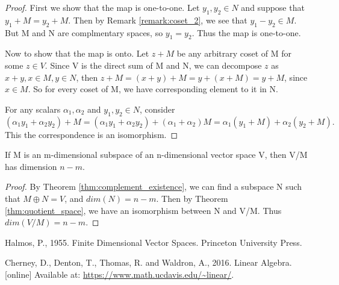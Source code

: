 \documentclass[10pt,a4paper]{article}
\begin{document}
\begin{proof}
    First we show that the map is one-to-one. Let $y_1,y_2\in N$ and suppose that $y_1+M=y_2+M$. Then by Remark \ref{remark:coset_2}, we see that $y_1-y_2\in M$. But M and N are complmentary spaces, so $y_1=y_2$. Thus the map is one-to-one.

    Now to show that the map is onto. Let $z+M$ be any arbitrary coset of M for some $z\in V$. Since V is the direct sum of M and N, we can decompose $z$ as $x+y,x\in M, y\in N$, then $z+M=(x+y)+M=y+(x+M)=y+M$, since $x\in M$. So for every coset of M, we have corresponding element to it in N. 

    For any scalars $\alpha_1,\alpha_2$ and $y_1,y_2\in N$, consider
    $$
        (\alpha_1y_1+\alpha_2y_2)+M=(\alpha_1y_1+\alpha_2y_2)+(\alpha_1+\alpha_2)M=\alpha_1(y_1+M)+\alpha_2(y_2+M).
    $$
    This the correspondence is an isomorphism.
\end{proof}

\begin{theorem}\label{thm:dim_quotient_space}
    If M is an m-dimensional subspace of an n-dimensional vector space V, then V/M has dimension $n-m$.
\end{theorem}

\begin{proof}
    By Theorem \ref{thm:complement_existence}, we can find a subspace N such that $M\oplus N=V$, and $dim(N)=n-m$. Then by Theorem \ref{thm:quotient_space}, we have an isomorphism between N and V/M. Thus $dim(V/M)=n-m$.
\end{proof}




\newpage

\begin{thebibliography}{9}
Halmos, P., 1955. Finite Dimensional Vector Spaces. Princeton University Press.

Cherney, D., Denton, T., Thomas, R. and Waldron, A., 2016. Linear Algebra. [online] Available at: \url{https://www.math.ucdavis.edu/~linear/}.


\end{thebibliography}
\end{document}
